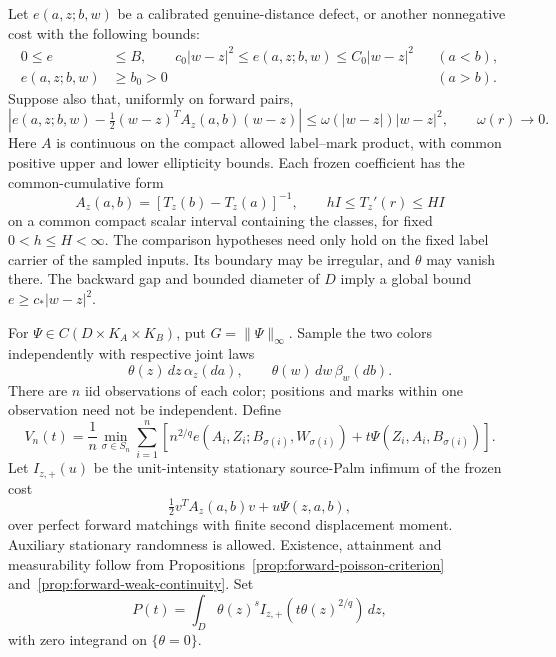 \documentclass[11pt,reqno]{amsart}
\theoremstyle{definition}
\theoremstyle{remark}
\numberwithin{equation}{section}
\begin{document}
Let \(e(a,z;b,w)\) be a calibrated genuine-distance defect, or another
nonnegative cost with the following bounds:
\begin{align}
\label{measurable-forward-cost}
 0\le e&\le B,\qquad
 c_0|w-z|^2\le e(a,z;b,w)\le C_0|w-z|^2 &&(a<b),\\
 e(a,z;b,w)&\ge b_0>0 &&(a>b).
 \nonumber
\end{align}
Suppose also that, uniformly on forward pairs,
\begin{equation}
\label{measurable-forward-expansion}
 \left|e(a,z;b,w)-\tfrac12(w-z)^TA_z(a,b)(w-z)\right|
 \le\omega(|w-z|)|w-z|^2,\qquad \omega(r)\longrightarrow0.
\end{equation}
Here \(A\) is continuous on the compact allowed label--mark product,
with common positive upper and lower ellipticity bounds. Each frozen
coefficient has the common-cumulative form
\[
 A_z(a,b)=[T_z(b)-T_z(a)]^{-1},
 \qquad hI\le T_z'(r)\le HI
\]
on a common compact scalar interval containing the classes, for fixed
\(0<h\le H<\infty\). The comparison hypotheses need only hold on the
fixed label carrier of the sampled inputs. Its boundary may be irregular,
and \(\theta\) may vanish there. The backward gap and bounded diameter
of \(D\) imply a global bound \(e\ge c_*|w-z|^2\).

For \(\Psi\in C(D\times K_A\times K_B)\), put \(G=\|\Psi\|_\infty\).
Sample the two colors independently with respective joint laws
\[
 \theta(z)\,dz\,\alpha_z(da),\qquad
 \theta(w)\,dw\,\beta_w(db).
\]
There are \(n\) iid observations of each color; positions and marks
within one observation need not be independent. Define
\begin{equation}
\label{measurable-forward-finite}
 V_n(t)=\frac1n\min_{\sigma\in S_n}\sum_{i=1}^n
 \left[n^{2/q}e(A_i,Z_i;B_{\sigma(i)},W_{\sigma(i)})
       +t\Psi(Z_i,A_i,B_{\sigma(i)})\right].
\end{equation}
Let \(I_{z,+}(u)\) be the unit-intensity stationary source-Palm
infimum of the frozen cost
\[
                   \tfrac12v^TA_z(a,b)v+u\Psi(z,a,b),
\]
over perfect forward
matchings with finite second displacement moment. Auxiliary stationary
randomness is allowed. Existence, attainment and measurability follow
from Propositions~\ref{prop:forward-poisson-criterion}
and~\ref{prop:forward-weak-continuity}. Set
\begin{equation}
\label{measurable-forward-integral}
 P(t)=\int_D\theta(z)^s I_{z,+}(t\theta(z)^{2/q})\,dz,
\end{equation}
with zero integrand on \(\{\theta=0\}\).
\end{document}
